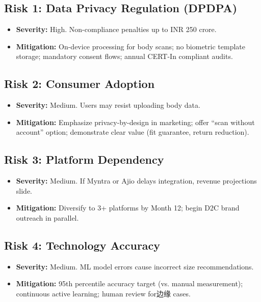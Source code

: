 \documentclass[12pt,a4paper]{article}
\begin{document}
\subsection{Risk 1: Data Privacy Regulation (DPDPA)}

\begin{itemize}
    \item \textbf{Severity:} High. Non-compliance penalties up to INR 250 crore.
    \item \textbf{Mitigation:} On-device processing for body scans; no biometric template storage; mandatory consent flows; annual CERT-In compliant audits.
\end{itemize}

\subsection{Risk 2: Consumer Adoption}

\begin{itemize}
    \item \textbf{Severity:} Medium. Users may resist uploading body data.
    \item \textbf{Mitigation:} Emphasize privacy-by-design in marketing; offer ``scan without account'' option; demonstrate clear value (fit guarantee, return reduction).
\end{itemize}

\subsection{Risk 3: Platform Dependency}

\begin{itemize}
    \item \textbf{Severity:} Medium. If Myntra or Ajio delays integration, revenue projections slide.
    \item \textbf{Mitigation:} Diversify to 3+ platforms by Month 12; begin D2C brand outreach in parallel.
\end{itemize}

\subsection{Risk 4: Technology Accuracy}

\begin{itemize}
    \item \textbf{Severity:} Medium. ML model errors cause incorrect size recommendations.
    \item \textbf{Mitigation:} 95th percentile accuracy target (vs. manual measurement); continuous active learning; human review for边缘 cases.
\end{itemize}
\end{document}
